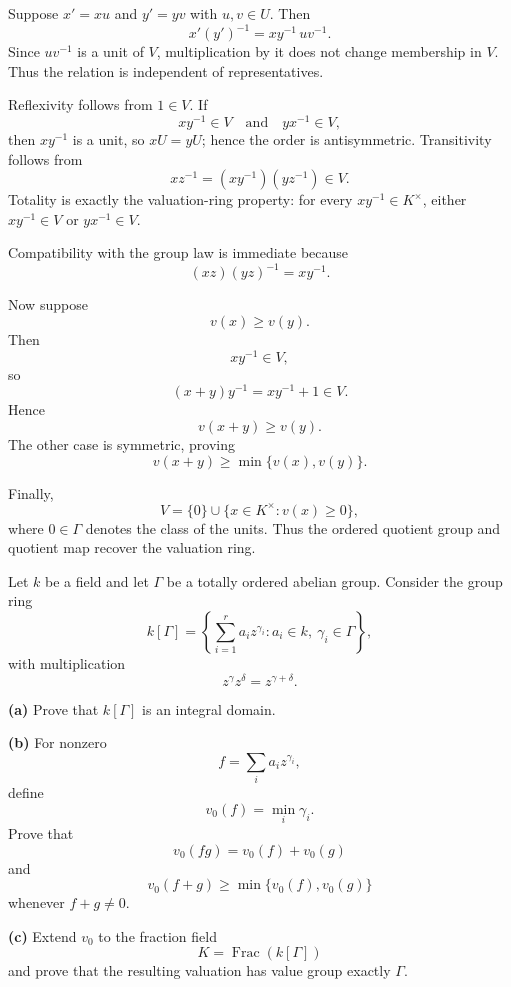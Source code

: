 \begin{solution}
Suppose \(x'=xu\) and \(y'=yv\) with \(u,v\in U\). Then
\[
x'(y')^{-1}
=
xy^{-1}\,uv^{-1}.
\]
Since \(uv^{-1}\) is a unit of \(V\), multiplication by it does not change
membership in \(V\). Thus the relation is independent of representatives.

Reflexivity follows from \(1\in V\). If
\[
xy^{-1}\in V
\quad\text{and}\quad
yx^{-1}\in V,
\]
then \(xy^{-1}\) is a unit, so \(xU=yU\); hence the order is antisymmetric.
Transitivity follows from
\[
xz^{-1}=(xy^{-1})(yz^{-1})\in V.
\]
Totality is exactly the valuation-ring property: for every
\(xy^{-1}\in K^\times\), either \(xy^{-1}\in V\) or \(yx^{-1}\in V\).

Compatibility with the group law is immediate because
\[
(xz)(yz)^{-1}=xy^{-1}.
\]

Now suppose
\[
v(x)\ge v(y).
\]
Then
\[
xy^{-1}\in V,
\]
so
\[
(x+y)y^{-1}=xy^{-1}+1\in V.
\]
Hence
\[
v(x+y)\ge v(y).
\]
The other case is symmetric, proving
\[
v(x+y)\ge\min\{v(x),v(y)\}.
\]

Finally,
\[
V
=
\{0\}\cup\{x\in K^\times:v(x)\ge0\},
\]
where \(0\in\Gamma\) denotes the class of the units. Thus the ordered quotient
group and quotient map recover the valuation ring.
\end{solution}


\begin{problem}[CP-V-0039]
\label{prob:cp-v-0039}
Let \(k\) be a field and let \(\Gamma\) be a totally ordered abelian group.
Consider the group ring
\[
k[\Gamma]
=
\left\{
\sum_{i=1}^r a_i z^{\gamma_i}:
a_i\in k,\ \gamma_i\in\Gamma
\right\},
\]
with multiplication
\[
z^\gamma z^\delta=z^{\gamma+\delta}.
\]

\textbf{(a)} Prove that \(k[\Gamma]\) is an integral domain.

\textbf{(b)} For nonzero
\[
f=\sum_i a_i z^{\gamma_i},
\]
define
\[
v_0(f)=\min_i\gamma_i.
\]
Prove that
\[
v_0(fg)=v_0(f)+v_0(g)
\]
and
\[
v_0(f+g)\ge\min\{v_0(f),v_0(g)\}
\]
whenever \(f+g\ne0\).

\textbf{(c)} Extend \(v_0\) to the fraction field
\[
K=\operatorname{Frac}(k[\Gamma])
\]
and prove that the resulting valuation has value group exactly \(\Gamma\).
\end{problem}

